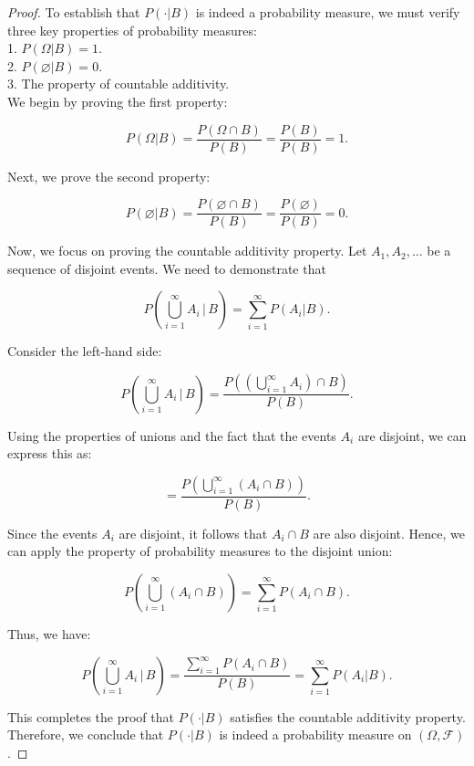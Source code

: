 \begin{proof}
To establish that \( P(\cdot | B) \) is indeed a probability measure, we must verify three key properties of probability measures:\\

1. \( P(\Omega | B) = 1 \).\\
2. \( P(\varnothing | B) = 0 \).\\
3. The property of countable additivity.\\

We begin by proving the first property:

\[
P(\Omega | B) = \frac{P(\Omega \cap B)}{P(B)} = \frac{P(B)}{P(B)} = 1.
\]

Next, we prove the second property:

\[
P(\varnothing | B) = \frac{P(\varnothing \cap B)}{P(B)} = \frac{P(\varnothing)}{P(B)} = 0.
\]

Now, we focus on proving the countable additivity property. Let \( A_1, A_2, \ldots \) be a sequence of disjoint events. We need to demonstrate that

\[
P\left( \bigcup_{i=1}^{\infty} A_i \, | \, B \right) = \sum_{i=1}^{\infty} P(A_i | B).
\]

Consider the left-hand side:

\[
P\left( \bigcup_{i=1}^{\infty} A_i \, | \, B \right) = \frac{P\left( \left( \bigcup_{i=1}^{\infty} A_i \right) \cap B \right)}{P(B)}.
\]

Using the properties of unions and the fact that the events \( A_i \) are disjoint, we can express this as:

\[
= \frac{P\left( \bigcup_{i=1}^{\infty} (A_i \cap B) \right)}{P(B)}.
\]

Since the events \( A_i \) are disjoint, it follows that \( A_i \cap B \) are also disjoint. Hence, we can apply the property of probability measures to the disjoint union:

\[
P\left( \bigcup_{i=1}^{\infty} (A_i \cap B) \right) = \sum_{i=1}^{\infty} P(A_i \cap B).
\]

Thus, we have:

\[
P\left( \bigcup_{i=1}^{\infty} A_i \, | \, B \right) = \frac{\sum_{i=1}^{\infty} P(A_i \cap B)}{P(B)} = \sum_{i=1}^{\infty} P(A_i | B).
\]

This completes the proof that \( P(\cdot | B) \) satisfies the countable additivity property. Therefore, we conclude that \( P(\cdot | B) \) is indeed a probability measure on \( (\Omega, \mathcal{F}) \).
\end{proof}

